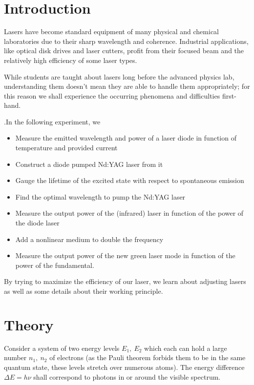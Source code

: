 
\section{Introduction}
Lasers have become standard equipment of many physical and chemical laboratories due to their sharp wavelength and coherence. Industrial applications, like optical disk drives and laser cutters, profit from their focused beam and the relatively high efficiency of some laser types.

While students are taught about lasers long before the advanced physics lab, understanding them doesn't mean they are able to handle them appropriately; for this reason we shall experience the occurring phenomena and difficulties first-hand.

.In the following experiment, we
\begin{itemize}
\item Measure the emitted wavelength and power of a laser diode in function of temperature and provided current
\item Construct a diode pumped Nd:YAG laser from it
\item Gauge the lifetime of the excited state with respect to spontaneous emission
\item Find the optimal wavelength to pump the Nd:YAG laser
\item Measure the output power of the (infrared) laser in function of the power of the diode laser
\item Add a nonlinear medium to double the frequency
\item Measure the output power of the new green laser mode in function of the power of the fundamental.
\end{itemize}

By trying to maximize the efficiency of our laser, we learn about adjusting lasers as well as some details about their working principle.

\newpage
\section{Theory}
Consider a system of two energy levels $E_1,~E_2$ which each can hold a large number $n_1,~n_2$ of electrons (as the Pauli theorem forbids them to be in the same quantum state, these levels stretch over numerous atoms). The energy difference $\Delta E = h \nu$ shall correspond to photons in or around the visible spectrum.

